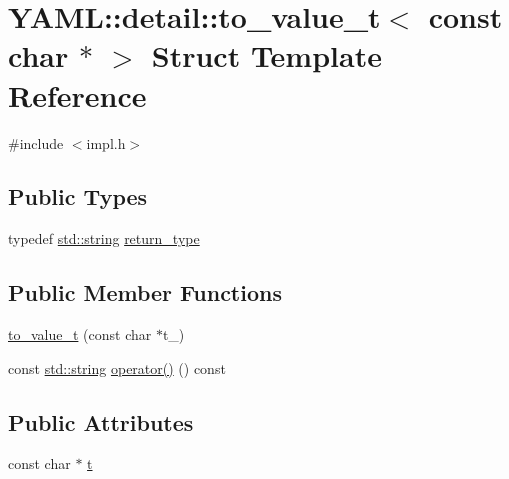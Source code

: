 \hypertarget{struct_y_a_m_l_1_1detail_1_1to__value__t_3_01const_01char_01_5_01_4}{}\section{Y\+A\+ML\+::detail\+::to\+\_\+value\+\_\+t$<$ const char $\ast$ $>$ Struct Template Reference}
\label{struct_y_a_m_l_1_1detail_1_1to__value__t_3_01const_01char_01_5_01_4}


{\ttfamily \#include $<$impl.\+h$>$}

\subsection*{Public Types}
\begin{DoxyCompactItemize}
\item 
typedef \mbox{\hyperlink{glad_8h_ac83513893df92266f79a515488701770}{std\+::string}} \mbox{\hyperlink{struct_y_a_m_l_1_1detail_1_1to__value__t_3_01const_01char_01_5_01_4_a8ade7c2c24d4d21add88f0d6a5c1b79e}{return\+\_\+type}}
\end{DoxyCompactItemize}
\subsection*{Public Member Functions}
\begin{DoxyCompactItemize}
\item 
\mbox{\hyperlink{struct_y_a_m_l_1_1detail_1_1to__value__t_3_01const_01char_01_5_01_4_a1ff4094d7875561235cbee1848b0d67f}{to\+\_\+value\+\_\+t}} (const char $\ast$t\+\_\+)
\item 
const \mbox{\hyperlink{glad_8h_ac83513893df92266f79a515488701770}{std\+::string}} \mbox{\hyperlink{struct_y_a_m_l_1_1detail_1_1to__value__t_3_01const_01char_01_5_01_4_a553beca888b7d6b29d90663e2cf42973}{operator()}} () const
\end{DoxyCompactItemize}
\subsection*{Public Attributes}
\begin{DoxyCompactItemize}
\item 
const char $\ast$ \mbox{\hyperlink{struct_y_a_m_l_1_1detail_1_1to__value__t_3_01const_01char_01_5_01_4_a61e56c7ce67e2e7cec7321959aa67079}{t}}
\end{DoxyCompactItemize}


